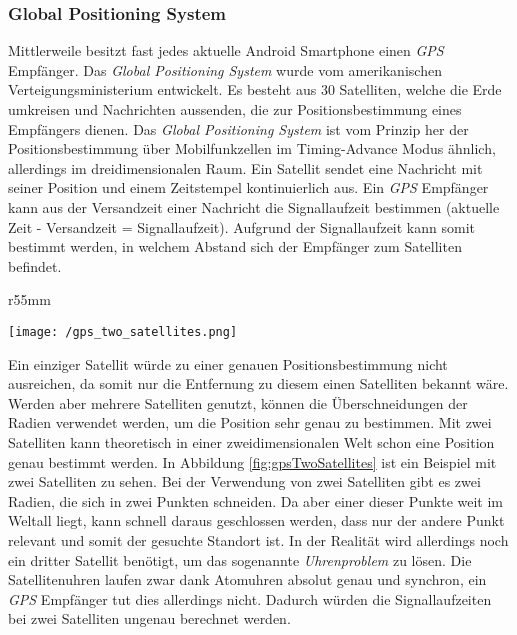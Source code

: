 \subsubsection{Global Positioning System}
Mittlerweile besitzt fast jedes aktuelle Android Smartphone einen \textit{GPS} Empfänger. 
Das \textit{Global Positioning System} wurde vom amerikanischen Verteigungsministerium entwickelt. Es besteht aus 30 Satelliten, welche die Erde umkreisen und Nachrichten aussenden, die zur Positionsbestimmung eines Empfängers dienen. Das \textit{Global Positioning System} ist vom Prinzip her der Positionsbestimmung über Mobilfunkzellen im Timing-Advance Modus ähnlich, allerdings im dreidimensionalen Raum. 
Ein Satellit sendet eine Nachricht mit seiner Position und einem Zeitstempel kontinuierlich aus.
Ein \textit{GPS} Empfänger kann aus der Versandzeit einer Nachricht die Signallaufzeit bestimmen (aktuelle Zeit - Versandzeit = Signallaufzeit). Aufgrund der Signallaufzeit kann somit bestimmt werden, in welchem Abstand sich der Empfänger zum Satelliten befindet. 
\begin{wrapfigure}{r}{55mm}
\centering
   \begin{center}
   	\texttt{[image: /gps\_two\_satellites.png]} 
   \end{center}
   \caption[Lokalisierung: GPS 2 Satelliten]{GPS 2 Satelliten}
   \label{fig:gpsTwoSatellites}
\end{wrapfigure}
Ein einziger Satellit würde zu einer genauen Positionsbestimmung nicht ausreichen, da somit nur die Entfernung zu diesem einen Satelliten bekannt wäre. Werden aber mehrere Satelliten genutzt, können die Überschneidungen der Radien verwendet werden, um die Position sehr genau zu bestimmen. Mit zwei Satelliten kann theoretisch in einer zweidimensionalen Welt schon eine Position genau bestimmt werden. In Abbildung \ref{fig:gpsTwoSatellites} ist ein Beispiel mit zwei Satelliten zu sehen. Bei der Verwendung von zwei Satelliten gibt es zwei Radien, die sich in zwei Punkten schneiden. Da aber einer dieser Punkte weit im Weltall liegt, kann schnell daraus geschlossen werden, dass nur der andere Punkt relevant und somit der gesuchte Standort ist. In der Realität wird allerdings noch ein dritter Satellit benötigt, um das sogenannte \textit{Uhrenproblem} zu lösen. Die Satellitenuhren laufen zwar dank Atomuhren absolut genau und synchron, ein \textit{GPS} Empfänger tut dies allerdings nicht. Dadurch würden die Signallaufzeiten bei zwei Satelliten ungenau berechnet werden. 

